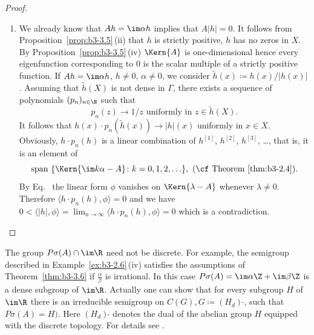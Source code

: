 \begin{proof}
\begin{enumerate}[wide, labelindent=.25em]
	\item[(iii)] 
	We already know that $Ah = \im\alpha h$ implies that $A|h| = 0$.
	It follows from Proposition~\ref{prop:b3-3.5}\,(ii) that $h$ is strictly positive, \ie $h$ has no zeros in $X$.
	By Proposition~\ref{prop:b3-3.5}\,(iv) $\Kern{A}$ is one-dimensional hence every
	eigenfunction corresponding to $0$ is the scalar multiple of a strictly positive function.
	If\/ $Ah = \im\alpha h$, $h \neq 0$, $\alpha \neq 0$, we consider $\tilde{h}(x) \coloneq h(x)/|h(x)|$.
	Assuming that $\tilde{h}(X)$ is not dense in $\Gamma$, there exists a sequence of polynomials $(p_{n})_{n\in\N}$ such that
	\begin{equation}\label{eq:b3-3.8}
		p_{n}(z) \to 1/z \text{ uniformly in } z \in \tilde{h}(X).
	\end{equation}
	It follows that $h(x)\cdot p_{n}(\tilde{h}(x)) \to |h|(x)$ uniformly in $x \in X$.
	Obviously, $h\cdot p_{n}(h)$ is a linear combination of\/ $h^{[1]}$, $h^{[2]}$, $h^{[3]}$, \ldots, that is, it is an element of
	\[
	\text{span $\{\Kern{ \im k\alpha - A} \colon  k=0,1,2,\ldots \}$}, \  \text{(\cf Theorem~\ref{thm:b3-2.4})}.
	\]
	By Eq.~ the linear form $\phi$ vanishes on $\Kern{\lambda - A}$ whenever $\lambda \neq 0$.
	Therefore $\langle h\cdot p_{n}(h),\phi\rangle = 0$ and we have $0 < \langle|h|,\phi\rangle = \lim_{n\to\infty}\langle h\cdot p_{n}(h),\phi\rangle = 0$ which is a contradiction.
	\end{enumerate}
\end{proof}
The group $P\sigma(A) \cap \im\R$ need not be discrete. 
For example, the semigroup described in Example~\ref{ex:b3-2.6}\,(iv) satisfies the assumptions of Theorem~\ref{thm:b3-3.6} if\/ $\frac{\alpha}{\beta}$ is irrational. 
In this case $P\sigma(A) = \im\alpha \Z + \im\beta \Z$ is a dense subgroup of\/ $\im \R$. 
Actually one can show that for every subgroup $H$ of\/ $\im \R$ there is an irreducible semigroup on $C(G), G \coloneqq (H_d)\,{\tilde{ }}$, such that $P\sigma(A) = H)$. 
Here $(H_d)\,{\tilde{ }}$ denotes the dual of the abelian group $H$ equipped with the discrete topology. 
For details see \textcite[p.62]{greiner:1982}. 

